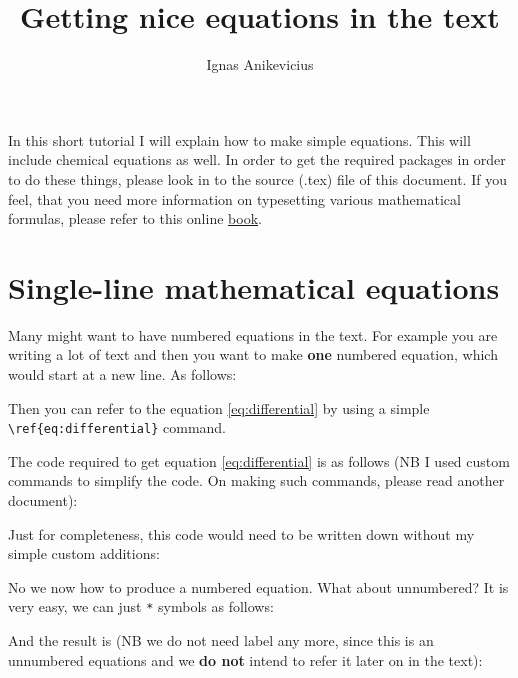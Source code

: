 

\usepackage[version=3]{mhchem}
\usepackage[]{amsmath}

\title{Getting nice equations in the text}
\author{Ignas Anikevicius}



\maketitle

In this short tutorial I will explain how to make simple equations. This will
include chemical equations as well. In order to get the required packages in
order to do these things, please look in to the source (.tex) file of this
document. If you feel, that you need more information on typesetting various
mathematical formulas, please refer to this online 
\href{https://secure.wikimedia.org/wikibooks/en/wiki/LaTeX/Mathematics}{book}.

\section{Single-line mathematical equations}

Many might want to have numbered equations in the text. For example you are
writing a lot of text and then you want to make \textbf{one} numbered equation,
which would start at a new line. As follows:


Then you can refer to the equation \ref{eq:differential} by using a simple
\verb|\ref{eq:differential}| command.

The code required to get equation \ref{eq:differential} is as follows (NB I used
custom commands to simplify the code. On making such commands, please read
another document):


Just for completeness, this code would need to be written down without my simple
custom additions:


No we now how to produce a numbered equation. What about unnumbered? It is very
easy, we can just \verb|*| symbols as follows:

And the result is (NB we do not need label any more, since this is an unnumbered
equations and we \textbf{do not} intend to refer it later on in the text):



